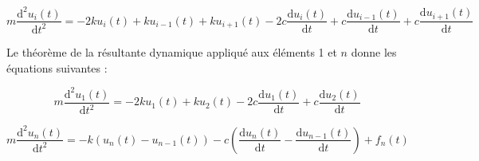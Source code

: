 \documentclass[10pt,fleqn]{article} %
\begin{document}
\begin{multicols}{2}
\begin{equation}
m\dfrac{\text{d}^2u_i(t)}{\text{d}t^2} = 
- 2 k u_i(t)  + k u_{i-1}(t) + k u_{i+1}(t)
- 2c \dfrac{\text{d}u_i(t)}{\text{d}t}   +c \dfrac{\text{d}u_{i-1}(t)}{\text{d}t} +c \dfrac{\text{d}u_{i+1}(t)}{\text{d}t}
\end{equation}

Le théorème de la résultante dynamique appliqué aux éléments 1 et $n$ donne les équations suivantes : 
%


\begin{equation}
m\dfrac{\text{d}^2u_1(t)}{\text{d}t^2} = 
- 2k u_1(t) + k u_2 (t) 
-2c \dfrac{\text{d}u_1(t)}{\text{d}t} 
+ c \dfrac{\text{d}u_2(t)}{\text{d}t} 
\end{equation}

\begin{equation}
m\dfrac{\text{d}^2u_n(t)}{\text{d}t^2} = 
-k\left(u_n(t)-u_{n-1}(t) \right)   - c\left(\dfrac{\text{d}u_{n}(t)}{\text{d}t}-\dfrac{\text{d}u_{n-1}(t)}{\text{d}t} \right) +f_n(t)
\end{equation}


\begin{minipage}[c]{.77\linewidth}


\begin{obj}

\end{obj}
\end{minipage} \hfill
\begin{minipage}[c]{.2\linewidth}

\end{minipage}


\end{multicols}
\end{document}
